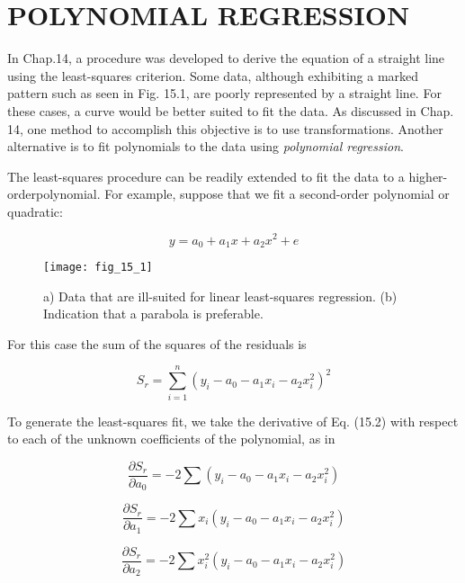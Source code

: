 \documentclass[../main.tex]{subfiles}
\begin{document}
\label{cha:cha_P_15_1}
\section{POLYNOMIAL REGRESSION}
\noindent In Chap.14, a procedure was developed to derive the equation of a straight line using the least-squares criterion. Some data, although exhibiting a marked pattern such as seen in Fig. 15.1, are poorly represented by a straight line. For these cases, a curve would be better suited to fit the data. As discussed in Chap. 14, one method to accomplish this objective is to use transformations. Another alternative is to fit polynomials to the data using \emph{polynomial regression}.

The least-squares procedure can be readily extended to fit the data to a higher-orderpolynomial. For example,  suppose that we fit a second-order polynomial or quadratic:

\begin{equation}
	\tag{15.1}
	y = a_0 + a_1x + a_2x^2 + e
\end{equation}

\begin{wrapfigure}{l}{0.25\textwidth}
    \centering
    \texttt{[image: fig\_15\_1]}
   \caption{\textsf{a) Data that are ill-suited for linear least-squares regression. (b) Indication that a parabola is preferable.}}
   \label{fig:fig_15_1}
\end{wrapfigure}

\noindent For this case the sum of the squares of the residuals is

\begin{equation}
	\tag{15.2}
	S_r = \sum^n_{i=1}(y_i - a_0 - a_1x_i - a_2x^2_i)^2
\end{equation}

To generate the least-squares fit, we take the derivative of Eq. (15.2) with respect to each of the unknown coefficients of the polynomial, as in

\begin{equation}
	\frac{\partial S_r}{\partial a_0} = -2 \sum (y_i -a_0 -a_1x_i - a_2x_i^2)
\end{equation}

\begin{equation}
	\frac{\partial S_r}{\partial a_1} = -2 \sum x_i (y_i -a_0 -a_1x_i - a_2x_i^2)
\end{equation}

\begin{equation}
	\frac{\partial S_r}{\partial a_2} = -2 \sum x_i^2 (y_i -a_0 -a_1x_i - a_2x_i^2)
\end{equation}
\end{document}
